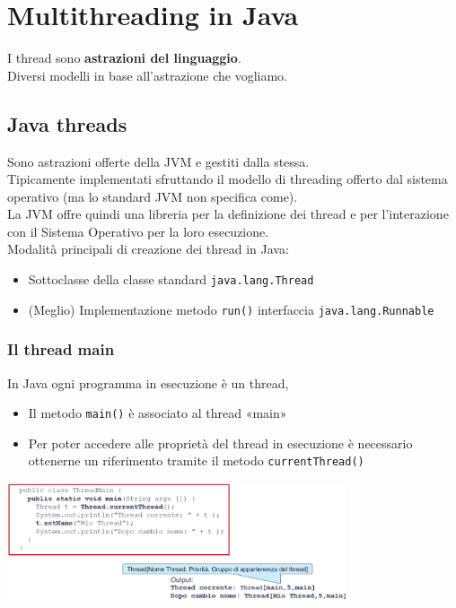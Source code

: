 \chapter{Multithreading in Java}
I thread sono \textbf{astrazioni del linguaggio}.
\\Diversi modelli in base all'astrazione che vogliamo.

\section{Java threads}
Sono astrazioni offerte della JVM e gestiti dalla stessa.
\\Tipicamente implementati sfruttando il modello di threading offerto dal sistema operativo (ma lo standard JVM non specifica come).
\\La JVM offre quindi una libreria per la definizione dei thread e per l'interazione con il Sistema Operativo per la loro esecuzione.
\\Modalità principali di creazione dei thread in Java:
\begin{itemize}
    \item Sottoclasse della classe standard \verb#java.lang.Thread#
    \item (Meglio) Implementazione metodo \verb#run()# interfaccia \verb#java.lang.Runnable#
\end{itemize}

\subsection{Il thread main}
In Java ogni programma in esecuzione è un thread,
\begin{itemize}
    \item Il metodo \verb#main()# è associato al thread «main»
    \item Per poter accedere alle proprietà del thread in esecuzione è necessario ottenerne un riferimento tramite il metodo \verb#currentThread()#
\end{itemize}
\begin{center}
    \includegraphics[width=0.75\textwidth]{img/thread_main1.jpg}
\end{center}

